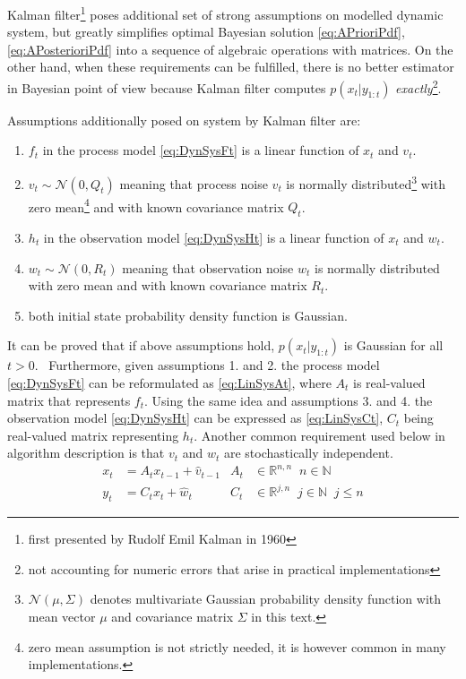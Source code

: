 \documentclass[a4paper,12pt,oneside]{report}
\newcommand{\pdf}{probability density function}
\begin{document}
Kalman filter\footnote{first presented by Rudolf Emil Kalman in 1960} poses additional set of strong
assumptions on modelled dynamic system, but greatly
simplifies optimal Bayesian solution \eqref{eq:APrioriPdf}, \eqref{eq:APosterioriPdf} into a
sequence of algebraic operations with matrices. On the other hand, when these requirements can be
fulfilled, there is no better estimator in Bayesian point of view because Kalman filter computes
\(p(x_t | y_{1:t})\) \emph{exactly}\footnote{not accounting for numeric errors that arise in
practical implementations}.

Assumptions additionally posed on system by Kalman filter are: %
\begin{enumerate}
	\item \(f_t\) in the process model \eqref{eq:DynSysFt} is a linear function of \(x_t\) and
	\(v_t\).
	\item \(v_t \sim \mathcal{N}(0, Q_t)\) meaning that process noise \(v_t\) is normally
	distributed\footnote{\(\mathcal{N}(\mu, \Sigma)\) denotes multivariate Gaussian {\pdf} with mean
	vector \(\mu\) and covariance matrix \(\Sigma\) in this text.}
	with zero mean\footnote{zero mean assumption is not strictly needed, it is however common in
	many implementations.} and with known covariance matrix \(Q_t\).
	\item \(h_t\) in the observation model \eqref{eq:DynSysHt} is a linear function of \(x_t\) and
	\(w_t\).
	\item \(w_t \sim \mathcal{N}(0, R_t)\) meaning that observation noise \(w_t\) is normally distributed
	with zero mean and with known covariance matrix \(R_t\).
	\item both initial state {\pdf} is Gaussian.
\end{enumerate}

It can be proved that if above assumptions hold, \(p(x_t|y_{1:t})\) is Gaussian for all
\(t > 0\).~\cite{AruMasGor:02} Furthermore, given assumptions 1. and 2. the process model
\eqref{eq:DynSysFt} can be reformulated as \eqref{eq:LinSysAt}, where \(A_t\) is real-valued matrix
that represents \(f_t\).
Using the same idea and assumptions 3. and 4. the observation model \eqref{eq:DynSysHt} can be
expressed as \eqref{eq:LinSysCt}, \(C_t\) being real-valued matrix representing \(h_t\). Another
common requirement used below in algorithm description is that \(v_t\) and \(w_t\) are
stochastically independent.
\begin{align}
	x_t &= A_t x_{t-1} + \hat{v}_{t-1} & A_t &\in \mathbb{R}^{n,n} \;\; n \in \mathbb{N} \label{eq:LinSysAt} \\
	y_t &= C_t x_t + \hat{w}_t & C_t &\in \mathbb{R}^{j,n} \;\; j \in \mathbb{N} \;\; j \leq n \label{eq:LinSysCt}
\end{align}
\end{document}
